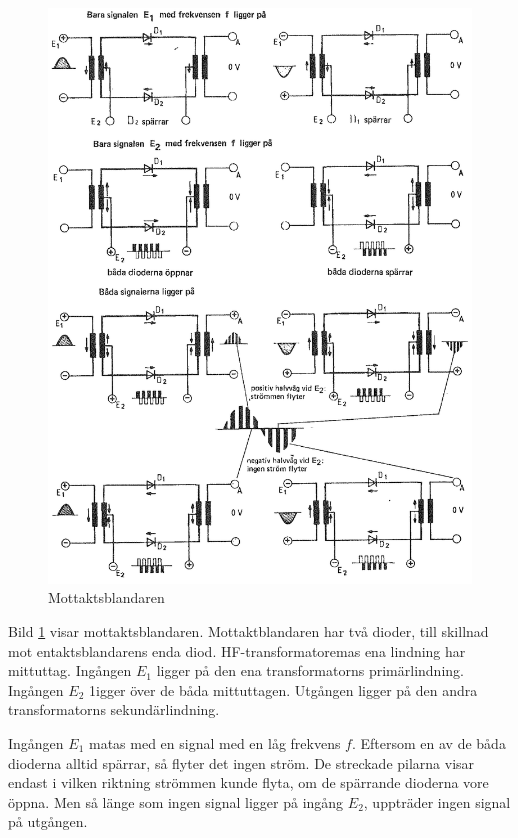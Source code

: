 \begin{figure}
\includegraphics[width=\textwidth]{images/cropped_pdfs/bild_2_3-85.pdf}
\caption{Mottaktsblandaren}
\label{fig:BildII3-85}
\end{figure}

Bild \ref{fig:BildII3-85} visar mottaktsblandaren.
Mottaktblandaren har två dioder, till skillnad mot entaktsblandarens enda diod.
HF-transformatoremas ena lindning har mittuttag.
Ingången \(E_1\) ligger på den ena transformatorns primärlindning.
Ingången \(E_2\) 1igger över de båda mittuttagen.
Utgången ligger på den andra transformatorns sekundärlindning.

Ingången \(E_1\) matas med en signal med en låg frekvens \(f\).
Eftersom en av de båda dioderna alltid spärrar, så flyter det ingen ström.
De streckade pilarna visar endast i vilken riktning strömmen kunde flyta, om de
spärrande dioderna vore öppna.
Men så länge som ingen signal ligger på ingång \(E_2\), uppträder ingen
signal på utgången.


